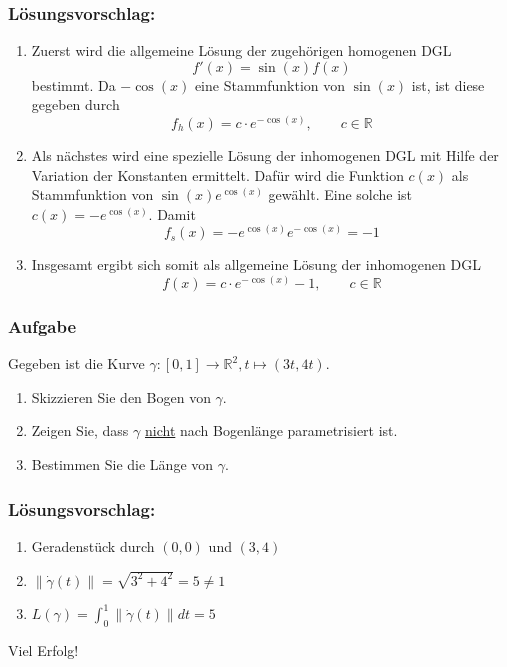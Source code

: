\documentclass[a4paper,11pt]{scrartcl}
\newcounter{auf}
\newcommand{\Aufgabe}%
        {\addtocounter{auf}{1} \subsubsection*{\rmfamily  Aufgabe \theauf \hspace{1em}} }
\newcommand{\RR}{\mathbb{R}}
\begin{document}
\subsubsection*{Lösungsvorschlag:}
\begin{enumerate}[1)]
\item Zuerst wird die allgemeine Lösung der zugehörigen homogenen DGL 
$$
f'(x)=\sin(x)f(x)
$$
bestimmt. Da $-\cos(x)$ eine Stammfunktion von $\sin(x)$ ist, ist diese gegeben durch
$$
f_h(x)=c\cdot e^{-\cos(x)} ,\qquad c \in \RR
$$
\item Als nächstes wird eine spezielle Lösung der inhomogenen DGL mit Hilfe der Variation der Konstanten ermittelt. Dafür wird die Funktion $c(x)$ als Stammfunktion von $\sin(x)e^{\cos(x)}$ gewählt. Eine solche ist $c(x)=-e^{\cos(x)}$. Damit
$$
f_s(x)=-e^{\cos(x)}e^{-\cos(x)}=-1
$$
\item Insgesamt ergibt sich somit als allgemeine Lösung der inhomogenen DGL
$$
f(x)=c\cdot e^{-\cos(x)}-1 ,\qquad c \in \RR
$$
\end{enumerate}
\newpage
\Aufgabe
Gegeben ist die Kurve $\gamma: [0,1] \to \RR^2, t \mapsto (3t,4t)$.
\begin{enumerate}
\item Skizzieren Sie den Bogen von $\gamma$.
\item Zeigen Sie, dass $\gamma$ \underline{nicht} nach Bogenlänge parametrisiert ist.
\item Bestimmen Sie die Länge von $\gamma$.
\end{enumerate}


\subsubsection*{Lösungsvorschlag:}
\begin{enumerate}
\item Geradenstück durch $(0,0)$ und $(3,4)$
\item $\|\dot \gamma(t)\|=\sqrt{3^2+4^2}=5 \ne 1$
\item $L(\gamma)=\int_0^1 \|\dot \gamma(t)\| dt = 5$
\end{enumerate}
\vfill \hfill Viel Erfolg!
\end{document}
